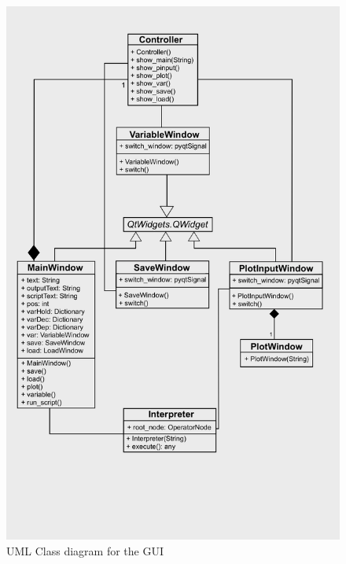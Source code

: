 \documentclass[a4paper, oneside, 11pt]{report}
\begin{document}
\begin{figure}[H]
    \centering
    \includegraphics[width=15cm]{UMLClass2.png}
    \caption{UML Class diagram for the GUI}
    \label{fig:UMLClassGUI}
\end{figure}

\newpage
\end{document}
